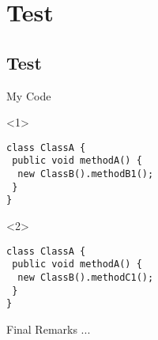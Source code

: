 \documentclass{beamer}
\begin{document}
\section{Test}
\subsection{Test}

\begin{frame}[fragile]{My Code}

\begin{onlyenv}<1>
\begin{lstlisting}[mathescape=true]
class ClassA {
 public void methodA() {
  new ClassB().methodB1();
 }
}
 \end{lstlisting}
\end{onlyenv}

\begin{onlyenv}<2>
\begin{lstlisting}[mathescape=true]
class ClassA {
 public void methodA() {
  new ClassB().methodC1();
 }
}
 \end{lstlisting}
\end{onlyenv}
\end{frame}

\begin{frame}[fragile]{Final Remarks}
...
\end{frame}
\end{document}
